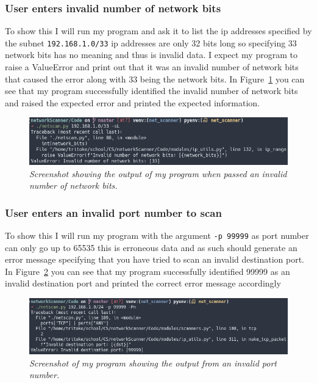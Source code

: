 \documentclass[titlepage]{article}
\let\Oldsubsubsection\subsubsection{}
\renewcommand{\subsubsection}{\FloatBarrier\Oldsubsubsection}
\begin{document}
\subsubsection{User enters invalid number of network bits}
To show this I will run my program and ask it to list the
\gls{ip} addresses specified by the subnet \verb|192.168.1.0/33|
\gls{ip} addresses are only 32 bits long so specifying 33
network bits has no meaning and thus is invalid data.
I expect my program to raise a ValueError and print out
that it was an invalid number of network bits that caused
the error along with 33 being the network bits.
In Figure~\ref{invalidnetworkbits} you can see that
my program successfully identified the invalid number of network bits
and raised the expected error and printed the expected information.

\begin{figure}[H]
\centering
\includegraphics[width=\textwidth]{invalidnetworkbits.png}
\caption{\textit{%
  Screenshot showing the output of my program when passed
  an invalid number of network bits.
}}\label{invalidnetworkbits}
\end{figure}

\subsubsection{User enters an invalid port number to scan}
To show this I will run my program with the argument \verb|-p 99999|
as port number can only go up to 65535 this is erroneous data
and as such should generate an error message specifying that 
you have tried to scan an invalid destination port.
In Figure~\ref{invalidportnum} you can see that my program
successfully identified 99999 as an invalid destination port
and printed the correct error message accordingly

\begin{figure}[H]
\centering
\includegraphics[width=\textwidth]{invalidportnum.png}
\caption{\textit{%
  Screenshot of my program showing the output from an invalid port number.
}}\label{invalidportnum}
\end{figure}
\end{document}
